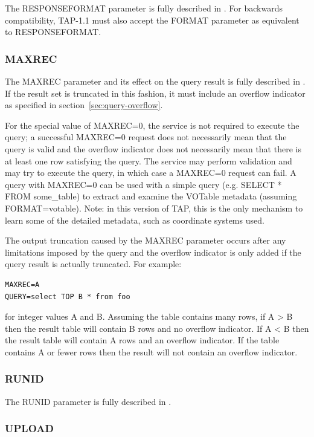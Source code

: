 \documentclass[11pt,letter]{ivoa}
\begin{document}
The RESPONSEFORMAT parameter is fully described in \citep{std:DALI}. For 
backwards 
compatibility, TAP-1.1 must also accept the FORMAT parameter as equivalent to 
RESPONSEFORMAT.

\subsubsection{MAXREC}
\label{sec:MAXREC}

The MAXREC parameter and its effect on the query result is fully described in 
\citep{std:DALI}. If the result set is truncated in this fashion, it must 
include an overflow indicator as specified in section~\ref{sec:query-overflow}.

For the special value of MAXREC=0, the service is not required to execute the 
query; a successful  MAXREC=0 request does not necessarily mean that the query 
is valid and the overflow indicator does not necessarily mean that there is at 
least one row satisfying the query. The service may perform validation and may 
try to execute the query, in which case a MAXREC=0 request can fail. A query 
with MAXREC=0 can be used with a simple query (e.g. SELECT * FROM  
some\_table) to extract and examine the VOTable metadata (assuming 
FORMAT=votable). Note: in this version of TAP, this is the only mechanism to 
learn some of the detailed metadata, such as coordinate systems used.

The output truncation caused by the MAXREC parameter occurs after any 
limitations imposed by the query and the overflow indicator is only added if 
the query result is actually truncated. For example:

\begin{verbatim}
MAXREC=A
QUERY=select TOP B * from foo
\end{verbatim}

for integer values A and B. Assuming the table contains many rows, if A > B 
then the result table will contain B rows and no overflow indicator. If A < B 
then the result table will contain A rows and an overflow indicator. If the 
table contains A or fewer rows then the result will not contain an overflow 
indicator.

\subsubsection{RUNID}
The RUNID parameter is fully described in \citep{std:DALI}.

\subsubsection{UPLOAD}
\label{sec:UPLOAD}
\end{document}
